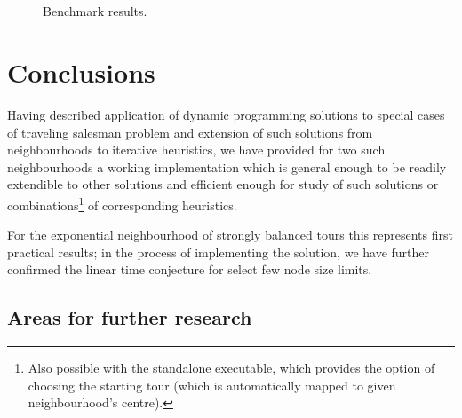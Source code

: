 \documentclass[index=totoc,bibliography=totoc]{scrartcl}
\numberwithin{equation}{section}
\numberwithin{figure}{section}
\numberwithin{table}{section}
\begin{document}
\begin{figure}[htbp]
\null\hfill%
\hfill\null\\
\null\hfill%
\hfill\null\\
\null\hfill%
\hfill\null
\caption{Benchmark results.}
\label{fig:benchTSPLIB}
\end{figure}


\section{Conclusions}
\vspace{0.87em}

Having described application of dynamic programming solutions to special
cases of traveling salesman problem and extension of such solutions
from neighbourhoods to iterative heuristics,
we have provided for two such neighbourhoods a working implementation which
is general enough to be readily extendible to other solutions and
efficient enough for study of such solutions or combinations\footnote{%
  Also possible with the standalone executable, which
  provides the option of choosing the starting tour
  (which is automatically mapped to given neighbourhood's centre).
}
of corresponding heuristics.

For the exponential neighbourhood of strongly balanced tours this
represents first practical results; in the process of implementing the solution,
we have further confirmed the linear time conjecture for select few node size limits.

\subsection{Areas for further research}
\end{document}
